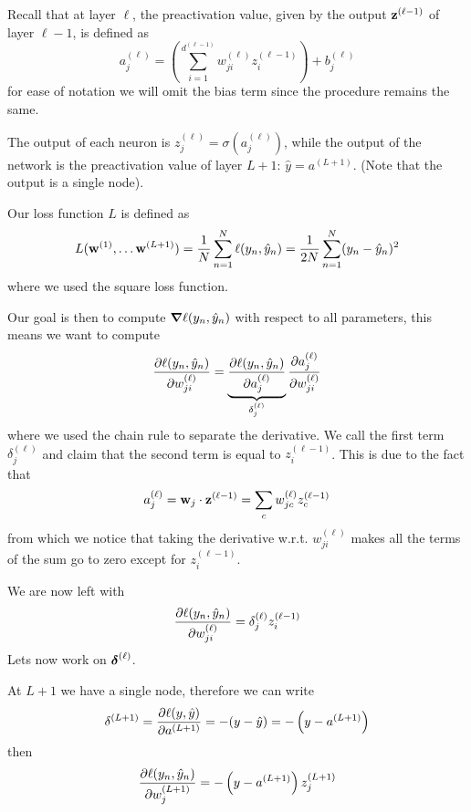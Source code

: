 \documentclass[12pt]{extarticle}
\renewcommand{\vec}[1]{\bvec{#1}}
\begin{document}
Recall that at layer $\ell$, the preactivation value, given by the output $\vec z^{(\ell - 1)}$ of
layer $\ell - 1$, is defined as
\begin{equation}
	a^{(\ell)}_j = \left( \sum_{i = 1}^{d^{(\ell - 1)}} w_{ji}^{(\ell)} z_i^{(\ell - 1)}\right) +
	b_j^{(\ell)}
\end{equation}
for ease of notation we will omit the bias term since the procedure remains the same.

The output of each neuron is $z_j^{(\ell)} = \sigma(a_j^{(\ell)})$, while the output of the network
is the preactivation value of layer $L + 1$: $\hat{y} = a^{(L+1)}$.
(Note that the output is a single node).

Our loss function $L$ is defined as
\begin{equation}
	L(\vec w^{(1)}, \dots \vec w^{(L+1)}) = \frac{1}{N} \sum_{n = 1}^N \ell(y_n, \hat y_n)
	= \frac{1}{2N} \sum_{n = 1}^N (y_n - \hat y_n)^2
\end{equation}
where we used the square loss function.

Our goal is then to compute $\grad \ell (y_n, \hat y_n)$ with respect to all parameters, this
means we want to compute
\begin{equation}
	\pdv{\ell(y_n, \hat y_n)}{w_{ji}^{(\ell)}} =
	\underbrace{\pdv{\ell(y_n, \hat y_n)}{a_{j}^{(\ell)}}}_{\delta^{(\ell)}_j}
	\pdv{a_{j}^{(\ell)}}{w_{ji}^{(\ell)}}
\end{equation}
where we used the chain rule to separate the derivative. We call the first term $\delta^{(\ell)}_j$
and claim that the second term is equal to $z_i^{(\ell - 1)}$. This is due to the fact that
\begin{equation}
	a^{(\ell)}_j = \vec w_j \cdot \vec z^{(\ell -1)} = \sum_c w_{jc}^{(\ell)} z_c^{(\ell - 1)}
\end{equation}
from which we notice that taking the derivative w.r.t. $w^{(\ell)}_{ji}$ makes all the terms of the
sum go to zero except for $z_i^{(\ell - 1)}$.

We are now left with
\begin{equation}
	\pdv{\ell(y_n, \hat y_n)}{w_{ji}^{(\ell)}} = \delta^{(\ell)}_j z_i^{(\ell - 1)}
\end{equation}
Lets now work on $\vec \delta^{(\ell)}$.

At $L + 1$ we have a single node, therefore we can write
\begin{equation}
	\delta^{(L + 1)} = \pdv{\ell(y, \hat y)}{a^{(L+1)}} =  -(y- \hat y) = -\left(y - a^{(L+1)}\right)
\end{equation}
then
\begin{equation}
	\pdv{\ell(y_n, \hat y_n)}{w_{j}^{(L+1)}} =-\left(y - a^{(L+1)}\right) z_j^{(L+1)}
\end{equation}
\end{document}
